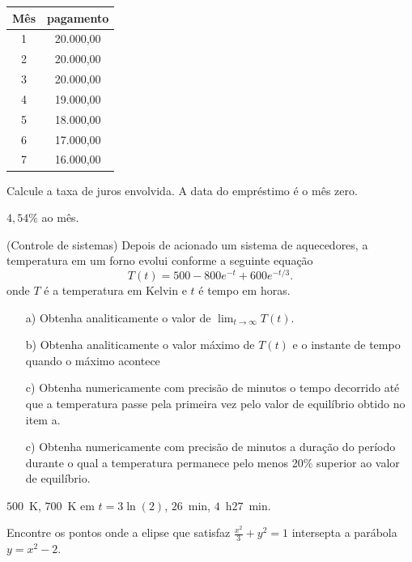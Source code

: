 \begin{ex}
\begin{exer}
\begin{tabular}{|c|c|}
\hline
Mês & pagamento\\
\hline
1&20.000,00\\
2&20.000,00\\
3&20.000,00\\
4&19.000,00\\
5&18.000,00\\
6&17.000,00\\
7&16.000,00\\
\hline
\end{tabular}

Calcule a taxa de juros envolvida. A data do empréstimo é o mês zero.
 \end{exer}

\begin{resp}

$4,54$\% ao mês.

\end{resp}


\begin{exer}(Controle de sistemas) Depois de acionado um sistema de aquecedores, a temperatura em um forno  evolui conforme a seguinte equação
\begin{equation} T(t)=500-800e^{-t}+600e^ {-t/3}. \end{equation}
onde $T$ é a temperatura em Kelvin e $t$ é tempo em horas.
\begin{itemize}
\item[a)] Obtenha analiticamente o valor de $\lim_{t\to\infty}T(t)$.
\item[b)] Obtenha analiticamente o valor máximo de $T(t)$ e o instante de tempo quando o máximo acontece
\item[c)] Obtenha numericamente com precisão de minutos o tempo decorrido até que a temperatura passe pela primeira vez pelo valor de equilíbrio obtido no item a.
\item[c)] Obtenha numericamente com precisão de minutos a duração do período durante o qual a temperatura permanece pelo menos 20\% superior ao valor de equilíbrio.
\end{itemize}
\end{exer}

\begin{resp}

$500$~K, $700$~K em $t=3\ln(2)$, $26$~min, $4$~h$27$~min.

\end{resp}

\begin{exer} Encontre os pontos onde a elipse que satisfaz $\frac{x^2}{3}+y^2=1$ intersepta a parábola $y=x^2-2$.
\end{exer}
\begin{resp}


\end{resp}
\end{ex}
